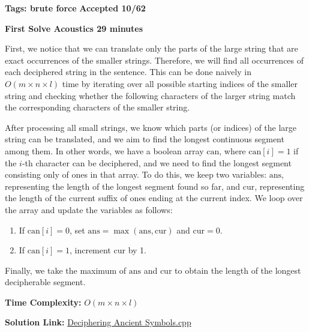 \documentclass{article}
\begin{document}
\vspace{2em}
\noindent \textbf{Tags: brute force} 
\hfill \textbf{Accepted 10/62}

\hfill \textbf{First Solve Acoustics 29 minutes}

\vspace{2em}

\noindent First, we notice that we can translate only the parts of the large string that are exact occurrences of the smaller strings. Therefore, we will find all occurrences of each deciphered string in the sentence. This can be done naively in \(O(m \times n \times l)\) time by iterating over all possible starting indices of the smaller string and checking whether the following characters of the larger string match the corresponding characters of the smaller string.

\vspace{1em}

\noindent After processing all small strings, we know which parts (or indices) of the large string can be translated, and we aim to find the longest continuous segment among them. In other words, we have a boolean array \(\text{can}\), where \(\text{can}[i] = 1\) if the \(i\)-th character can be deciphered, and we need to find the longest segment consisting only of ones in that array. To do this, we keep two variables: \(\text{ans}\), representing the length of the longest segment found so far, and \(\text{cur}\), representing the length of the current suffix of ones ending at the current index. We loop over the array and update the variables as follows:

\begin{enumerate}
    \item If \(\text{can}[i] = 0\), set \(\text{ans} = \max(\text{ans}, \text{cur})\) and \(\text{cur} = 0\).
    \item If \(\text{can}[i] = 1\), increment \(\text{cur}\) by 1.
\end{enumerate}

\noindent Finally, we take the maximum of \(\text{ans}\) and \(\text{cur}\) to obtain the length of the longest decipherable segment.


\vspace{1em}

\noindent \textbf{Time Complexity:}
$O(m \times n \times l)$

\vspace{1em}
\noindent \textbf{Solution Link:} 
\href{https://github.com/StathisKons/GRCPC-2024-Editorial-Implementations/blob/main/D.%20Deciphering%20Ancient%20Symbols.cpp}{Deciphering Ancient Symbols.cpp}
\end{document}
